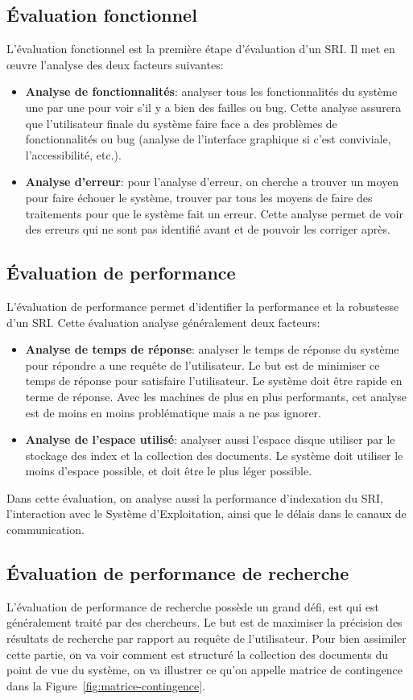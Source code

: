 \subsection{Évaluation fonctionnel}
L'évaluation fonctionnel est la première étape d'évaluation d'un SRI. Il met en œuvre l'analyse des deux facteurs suivantes:
\begin{itemize}
	\item \textbf{Analyse de fonctionnalités}: analyser tous les fonctionnalités du système une par une pour voir s'il y a bien des failles ou bug. Cette analyse assurera que l'utilisateur finale du système faire face a des problèmes de fonctionnalités ou bug (analyse de l'interface graphique si c'est conviviale, l'accessibilité, etc.).
	\item \textbf{Analyse d’erreur}: pour l'analyse d'erreur, on cherche a trouver un moyen pour faire échouer le système, trouver par tous les moyens de faire des traitements pour que le système fait un erreur. Cette analyse permet de voir des erreurs qui ne sont pas identifié avant et de pouvoir les corriger après.
\end{itemize}

\subsection{Évaluation de performance}
L'évaluation de performance permet d'identifier la performance et la robustesse d'un SRI. Cette évaluation analyse généralement deux facteurs:
\begin{itemize}
	\item \textbf{Analyse de temps de réponse}: analyser le temps de réponse du système pour répondre a une requête de l'utilisateur. Le but est de minimiser ce temps de réponse pour satisfaire l'utilisateur. Le système doit être rapide en terme de réponse. Avec les machines de plus en plus performants, cet analyse est de moins en moins problématique mais a ne pas ignorer.
	\item \textbf{Analyse de l’espace utilisé}: analyser aussi l'espace disque utiliser par le stockage des index et la collection des documents. Le système doit utiliser le moins d’espace possible, et doit être le plus léger possible.
\end{itemize}

Dans cette évaluation, on analyse aussi la performance d'indexation du SRI, l’interaction avec le Système d'Exploitation, ainsi que le délais dans le canaux de communication.

\subsection{Évaluation de performance de recherche}
L'évaluation de performance de recherche possède un grand défi, est qui est généralement traité par des chercheurs. Le but est de maximiser la précision des résultats de recherche par rapport au requête de l'utilisateur. Pour bien assimiler cette partie, on va voir comment est structuré la collection des documents du point de vue du système, on va illustrer ce qu'on appelle matrice de contingence dans la Figure~\ref{fig:matrice-contingence}.


